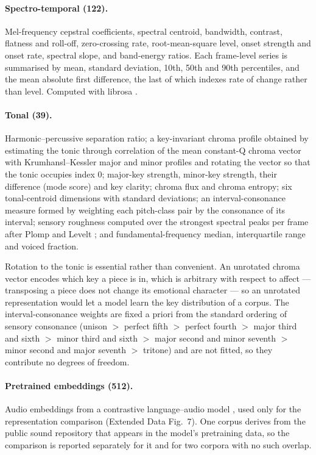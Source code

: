\paragraph{Spectro-temporal (122).}
Mel-frequency cepstral coefficients, spectral centroid, bandwidth, contrast,
flatness and roll-off, zero-crossing rate, root-mean-square level, onset strength
and onset rate, spectral slope, and band-energy ratios. Each frame-level series is
summarised by mean, standard deviation, 10th, 50th and 90th percentiles, and the
mean absolute first difference, the last of which indexes rate of change rather
than level. Computed with librosa \citep{mcfee2015}.

\paragraph{Tonal (39).}
Harmonic--percussive separation ratio; a key-invariant chroma profile obtained by
estimating the tonic through correlation of the mean constant-Q chroma vector with
Krumhansl--Kessler major and minor profiles \citep{krumhansl1982} and rotating the
vector so that the tonic occupies index 0; major-key strength, minor-key strength,
their difference (mode score) and key clarity; chroma flux and chroma entropy; six
tonal-centroid dimensions with standard deviations; an interval-consonance measure
formed by weighting each pitch-class pair by the consonance of its interval;
sensory roughness computed over the strongest spectral peaks per frame after Plomp
and Levelt \citep{plomp1965}; and fundamental-frequency median, interquartile range
and voiced fraction.

Rotation to the tonic is essential rather than convenient. An unrotated chroma
vector encodes which key a piece is in, which is arbitrary with respect to affect
--- transposing a piece does not change its emotional character --- so an unrotated
representation would let a model learn the key distribution of a corpus. The
interval-consonance weights are fixed a priori from the standard ordering of
sensory consonance (unison $>$ perfect fifth $>$ perfect fourth $>$ major third and
sixth $>$ minor third and sixth $>$ major second and minor seventh $>$ minor second
and major seventh $>$ tritone) and are not fitted, so they contribute no degrees of
freedom.

\paragraph{Pretrained embeddings (512).}
Audio embeddings from a contrastive language--audio model \citep{wu2023clap},
used only for the representation comparison (Extended Data Fig.~7). One corpus
derives from the public sound repository that appears in the model's pretraining
data, so the comparison is reported separately for it and for two corpora with no
such overlap.

